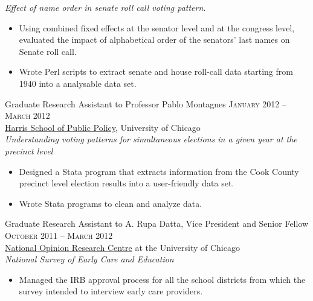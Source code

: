\documentclass[11pt]{article}
\begin{document}
\emph{Effect of name order in senate roll call voting pattern.}
\begin{itemize}
\item Using combined fixed effects at the senator level and at the
congress level, evaluated the impact of alphabetical order of the
senators' last names on Senate roll call.
\item Wrote Perl scripts to extract senate and house roll-call data starting from 1940 into a analysable data set.
\end{itemize}
\vspace{0.5em}
Graduate Research Assistant to Professor Pablo Montagnes \hfill
\textsc{January 2012 -- March 2012}\\
\href{http://harrisschool.uchicago.edu/directory/faculty/b-pablo_montagnes}{Harris School of Public Policy}, University of Chicago \\
\emph{Understanding voting patterns for simultaneous elections in a given year at the precinct level}
\begin{itemize}
\item Designed a Stata program that extracts information from the Cook
County precinct level election results into a user-friendly data
set.
\item Wrote Stata programs to clean and analyze data.
\end{itemize}
\vspace{0.5em}
Graduate Research Assistant to A. Rupa Datta, Vice President and
Senior Fellow  \hfill \textsc{October 2011 -- March 2012}\\
\href{http://www.norc.org/Research/Projects/Pages/national-survey-of-early-care-and-education.aspx}{National Opinion Research Centre} at the University of Chicago \\
\emph{National Survey of Early Care and Education}
\begin{itemize}
\item Managed the IRB approval process for all the school districts
from which the survey intended to interview early care providers.
\end{itemize}
\end{document}
